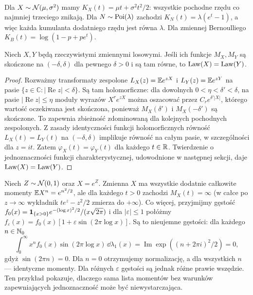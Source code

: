 \begin{przyklad}
Dla $X\sim\mathcal{N}(\mu,\sigma^2)$ mamy
$K_X(t)=\mu t+\sigma^2t^2/2$: wszystkie pochodne
rzędu co najmniej trzeciego znikają. Dla
$N\sim\operatorname{Poi}(\lambda)$ zachodzi $K_N(t)=\lambda(e^t-1)$,
a więc każda kumulanta dodatniego rzędu jest równa $\lambda$.
Dla zmiennej Bernoulliego $K_B(t)=\log(1-p+pe^t)$.
\end{przyklad}

\begin{stwierdzenie}
Niech $X,Y$ będą rzeczywistymi zmiennymi losowymi.
Jeśli ich funkcje $M_X,M_Y$ są skończone na
$(-\delta,\delta)$ dla pewnego $\delta>0$
i są tam równe, to $\operatorname{Law}(X)=\operatorname{Law}(Y)$.
\end{stwierdzenie}
\begin{proof}
Rozważmy transformaty zespolone
$L_X(z)=\mathbb{E} e^{zX}$ i $L_Y(z)=\mathbb{E} e^{zY}$
na pasie $\{z\in\mathbb C:|\operatorname{Re}z|<\delta\}$.
Są tam holomorficzne: dla dowolnych $0<\eta<\delta'
<\delta$, na pasie $|\operatorname{Re}z|\leq\eta$
moduły wyrazów $X^re^{zX}$ można oszacować przez
$C_r e^{\delta'|X|}$, którego wartość oczekiwana
jest skończona, ponieważ $M_X(\delta')$ i
$M_X(-\delta')$ są skończone. To zapewnia zbieżność
zdominowaną dla kolejnych pochodnych zespolonych.
Z zasady identyczności funkcji holomorficznych równość
$L_X(t)=L_Y(t)$ na $(-\delta,\delta)$ implikuje
równość na całym pasie, w szczególności dla $z=it$.
Zatem $\varphi_X(t)=\varphi_Y(t)$ dla każdego $t\in\mathbb{R}$.
Twierdzenie o jednoznaczności funkcji charakterystycznej,
udowodnione w następnej sekcji, daje $\operatorname{Law}(X)=\operatorname{Law}(Y)$.
\end{proof}

\begin{przyklad}
Niech $Z\sim\mathcal{N}(0,1)$ oraz $X=e^Z$.
Zmienna $X$ ma wszystkie dodatnie całkowite momenty
$\mathbb{E} X^n=e^{n^2/2}$, ale dla każdego $t>0$ zachodzi
$M_X(t)=\infty$ (w całce po $z\to\infty$ wykładnik
$t e^z-z^2/2$ zmierza do $+\infty$).
Co więcej, przyjmijmy gęstość $f_0(x)=
\mathbf{1}_{\{x>0\}}e^{-(\log x)^2/2}/(x\sqrt{2\pi})$
i dla $|\varepsilon|\leq1$ połóżmy
$f_\varepsilon(x)=f_0(x)[1+\varepsilon\sin(2\pi\log x)]$.
Są to nieujemne gęstości: dla każdego $n\in\mathbb{N}_0$
\[
\int_0^\infty x^n f_0(x)\sin(2\pi\log x)
\,\dd\lambda_1(x)
=\operatorname{Im}\exp((n+2\pi i)^2/2)=0,
\]
gdyż $\sin(2\pi n)=0$. Dla $n=0$ otrzymujemy
normalizację, a dla wszystkich $n$ --- identyczne momenty.
Dla różnych $\varepsilon$ gęstości są jednak różne prawie
wszędzie. Ten przykład pokazuje, dlaczego sama lista momentów
bez warunków zapewniających jednoznaczność może być niewystarczająca.
\end{przyklad}

